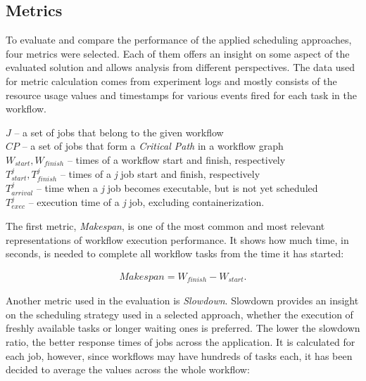 \subsection{Metrics}\label{s:ExperimentSetup:Metrics}


To evaluate and compare the performance of the applied scheduling approaches, four metrics were selected.
Each of them offers an insight on some aspect of the evaluated solution and allows analysis from different perspectives.
The data used for metric calculation comes from experiment logs and mostly consists of the resource usage values and timestamps for various events fired for each task in the workflow.


\begin{center}
\medskip
\begin{minipage}{0.8\textwidth}
$J $ -- a set of jobs that belong to the given workflow \\
\smallskip
$CP$ -- a set of jobs that form a \emph{Critical Path} in a workflow graph \\
\smallskip
$W_{start}, W_{finish}$ -- times of a workflow start and finish, respectively \\
\smallskip
$T_{start}^j, T_{finish}^j$ -- times of a \emph{j} job start and finish, respectively \\
\smallskip
$T_{arrival}^j$ -- time when a \emph{j} job becomes executable, but is not yet scheduled \\
\smallskip
$T_{exec}^j$ -- execution time of a \emph{j} job, excluding containerization.

\end{minipage}
\medskip
\end{center}



The first metric, \emph{Makespan}, is one of the most common and most relevant representations of workflow execution performance.
It shows how much time, in seconds, is needed to complete all workflow tasks from the time it has started:

\begin{align}
Makespan = W_{finish} - W_{start}
.
\end{align}


Another metric used in the evaluation is \emph{Slowdown}.
Slowdown provides an insight on the scheduling strategy used in a selected approach, whether the execution of freshly available tasks or longer waiting ones is preferred.
The lower the slowdown ratio, the better response times of jobs across the application.
It is calculated for each job, however, since workflows may have hundreds of tasks each, it has been decided to average the values across the whole workflow:

